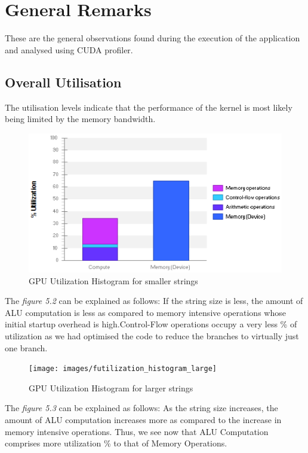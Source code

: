 \documentclass[a4paper,11pt]{report}
\begin{document}
{\section{General Remarks}
These are the general observations found during the execution of the application and analysed using CUDA profiler.
\subsection{Overall Utilisation}
The utilisation levels indicate that the performance of the kernel is most likely being limited by the memory bandwidth.
\begin{figure}
  \begin{center}
    \includegraphics{images/utilization_histogram_small}
    \caption{GPU Utilization Histogram for smaller strings}
    \label{fig:}
  \end{center}
\end{figure}
\newline
The \textit{figure 5.2} can be explained as follows:
If the string size is less, the amount of ALU computation is less as compared to memory intensive operations whose initial startup overhead is high.Control-Flow operations occupy a very less \% of utilization as we had optimised the code to reduce the branches to virtually just one branch.
\begin{figure}
  \begin{center}
    \texttt{[image: images/futilization\_histogram\_large]}
    \caption{GPU Utilization Histogram for larger strings}
    \label{fig:}
  \end{center}
\end{figure}
\newline
The \textit{figure 5.3} can be explained as follows:
As the string size increases, the amount of ALU computation increases more as compared to the increase in memory intensive operations. Thus, we see now that ALU Computation comprises more utilization \% to that of Memory Operations.

}
\end{document}
